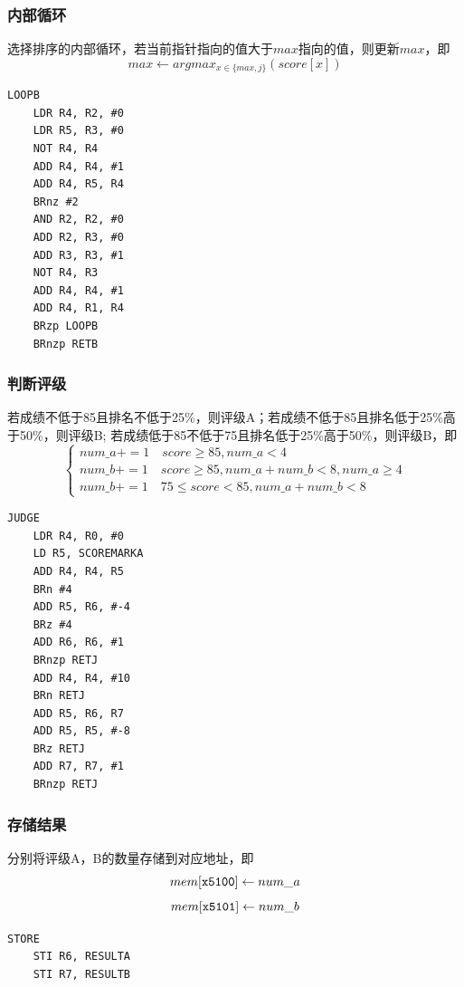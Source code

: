 \documentclass[12pt, a4paper, oneside]{ctexart}
\begin{document}
\subsubsection*{内部循环}
选择排序的内部循环，若当前指针指向的值大于$max$指向的值，则更新$max$，即
$$max \leftarrow argmax_{x \in \{ max, j \}  }(score[x])$$
\begin{lstlisting}[name = code, firstnumber = last]
    LOOPB
    LDR R4, R2, #0
    LDR R5, R3, #0
    NOT R4, R4
    ADD R4, R4, #1
    ADD R4, R5, R4
    BRnz #2
    AND R2, R2, #0
    ADD R2, R3, #0
    ADD R3, R3, #1
    NOT R4, R3
    ADD R4, R4, #1
    ADD R4, R1, R4
    BRzp LOOPB
    BRnzp RETB
\end{lstlisting}
\subsubsection*{判断评级}
若成绩不低于85且排名不低于25\%，则评级A；若成绩不低于85且排名低于25\%高于50\%，则评级B;
若成绩低于85不低于75且排名低于25\%高于50\%，则评级B，即
$$\begin{cases}
    num\_a += 1 \quad score \geq 85,num\_a < 4\\
    num\_b += 1 \quad score \geq 85,num\_a + num\_b < 8, num\_a \geq 4  \\
    num\_b += 1 \quad 75 \leq score < 85,num\_a + num\_b < 8
\end{cases}$$
\begin{lstlisting}[name = code, firstnumber = last]
    JUDGE
    LDR R4, R0, #0
    LD R5, SCOREMARKA 
    ADD R4, R4, R5
    BRn #4
    ADD R5, R6, #-4
    BRz #4
    ADD R6, R6, #1
    BRnzp RETJ
    ADD R4, R4, #10
    BRn RETJ
    ADD R5, R6, R7
    ADD R5, R5, #-8
    BRz RETJ
    ADD R7, R7, #1
    BRnzp RETJ
\end{lstlisting}
\subsubsection*{存储结果}
分别将评级A，B的数量存储到对应地址，即
$$mem[\verb|x5100|] \leftarrow num\_a$$
$$mem[\verb|x5101|] \leftarrow num\_b$$
\begin{lstlisting}[name = code, firstnumber = last]
    STORE
    STI R6, RESULTA
    STI R7, RESULTB
\end{lstlisting}
\end{document}
